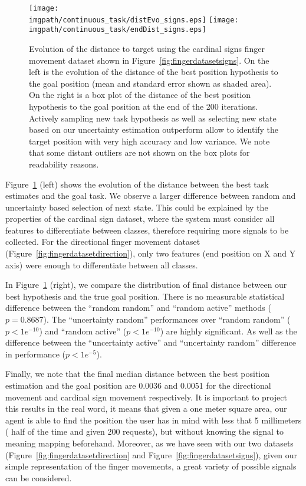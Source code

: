 \begin{figure}[!htbp]
\centering
\texttt{[image: \\imgpath/continuous\_task/distEvo\_signs.eps]}
\texttt{[image: \\imgpath/continuous\_task/endDist\_signs.eps]}
\caption{Evolution of the distance to target using the cardinal signs finger movement dataset shown in Figure~\ref{fig:fingerdatasetsigns}. On the left is the evolution of the distance of the best position hypothesis to the goal position (mean and standard error shown as shaded area). On the right is a box plot of the distance of the best position hypothesis to the goal position at the end of the 200 iterations. Actively sampling new task hypothesis as well as selecting new state based on our uncertainty estimation outperform allow to identify the target position with very high accuracy and low variance. We note that some distant outliers are not shown on the box plots for readability reasons.}
\label{fig:continuoustaskdistevolution_signs}
\end{figure}

Figure~\ref{fig:continuoustaskdistevolution_signs} (left) shows the evolution of the distance between the best task estimates and the goal task. We observe a larger difference between random and uncertainty based selection of next state. This could be explained by the properties of the cardinal sign dataset, where the system must consider all features to differentiate between classes, therefore requiring more signals to be collected. For the directional finger movement dataset (Figure~\ref{fig:fingerdatasetdirection}), only two features (end position on X and Y axis) were enough to differentiate between all classes.

In Figure~\ref{fig:continuoustaskdistevolution_signs} (right), we compare the distribution of final distance between our best hypothesis and the true goal position. There is no measurable statistical difference between the ``random random'' and ``random active'' methods ($p = 0.8687$). The ``uncertainty random'' performances over ``random random'' ($p<1e^{-10}$) and ``random active'' ($p<1e^{-10}$) are highly significant. As well as the difference between the ``uncertainty active'' and ``uncertainty random'' difference in performance ($p<1e^{-5}$).

Finally, we note that the final median distance between the best position estimation and the goal position are 0.0036 and 0.0051 for the directional movement and cardinal sign movement respectively. 
It is important to project this results in the real word, it means that given a one meter square area, our agent is able to find the position the user has in mind with less that 5 millimeters ( half of the time and given 200 requests), but without knowing the signal to meaning mapping beforehand. Moreover, as we have seen with our two datasets (Figure~\ref{fig:fingerdatasetdirection} and Figure~\ref{fig:fingerdatasetsigns}), given our simple representation of the finger movements, a great variety of possible signals can be considered.

